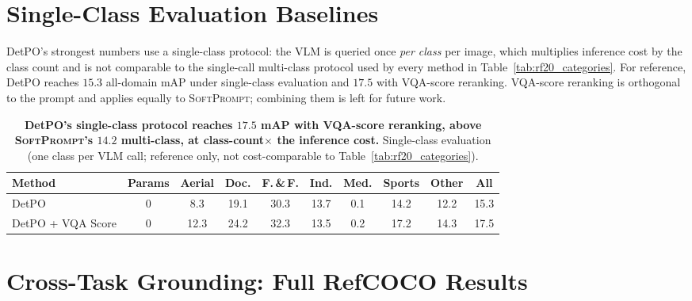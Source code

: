 \documentclass{article}
\newcommand{\ours}{\textsc{SoftPrompt}}
\begin{document}
\section{Single-Class Evaluation Baselines}
\label{app:single_class}

DetPO's strongest numbers use a single-class protocol: the VLM is queried once \emph{per class} per image, which multiplies inference cost by the class count and is not comparable to the single-call multi-class protocol used by every method in Table~\ref{tab:rf20_categories}.
For reference, DetPO reaches $15.3$ all-domain mAP under single-class evaluation and $17.5$ with VQA-score reranking.
VQA-score reranking is orthogonal to the prompt and applies equally to \ours{}; combining them is left for future work.

\begin{table}[h]
  \centering
  \caption{\textbf{DetPO's single-class protocol reaches $17.5$ mAP with VQA-score reranking, above \ours{}'s $14.2$ multi-class, at class-count$\times$ the inference cost.}
    Single-class evaluation (one class per VLM call; reference only, not cost-comparable to Table~\ref{tab:rf20_categories}).}
  \label{tab:single_class}
  \small
  \setlength{\tabcolsep}{4pt}
  \begin{tabular}{lcccccccc|c}
    \toprule
    \textbf{Method} & \textbf{Params} & \textbf{Aerial} & \textbf{Doc.}
                    & \textbf{F.\,\&\,F.} & \textbf{Ind.}
                    & \textbf{Med.} & \textbf{Sports}
                    & \textbf{Other} & \textbf{All} \\
    \midrule
    DetPO~\citep{Gare2026DetPO:Detection}     & 0 &  8.3 & 19.1 & 30.3 & 13.7 &  0.1 & 14.2 & 12.2 & 15.3 \\
    DetPO + VQA Score                         & 0 & 12.3 & 24.2 & 32.3 & 13.5 &  0.2 & 17.2 & 14.3 & 17.5 \\
    \bottomrule
  \end{tabular}
\end{table}


\newpage

\section{Cross-Task Grounding: Full RefCOCO Results}
\label{app:refcoco}
\end{document}
